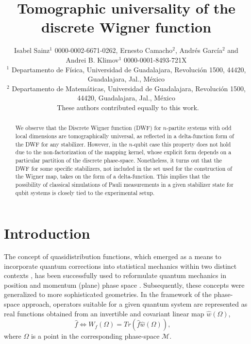 \documentclass{article}
\begin{document}
\title{Tomographic universality of the discrete Wigner function}

\begin{abstract}
We observe that the Discrete Wigner function (DWF) for $n$-partite systems with
odd local dimensions are tomographically universal, as reflected in a
delta-function form of the DWF for any stabilizer. However, in the $n$-qubit
case this property does not hold due to the non-factorization of the mapping
kernel, whose explicit form depends on a particular partition of the discrete
phase-space. Nonetheless, it turns out that the DWF for some specific
stabilizers, not included in the set used for the construction of the Wigner
map, takes on the form of a delta-function. This implies that the possibility of
classical simulations of Pauli measurements in a given stabilizer state for
qubit systems is closely tied to the experimental setup.
\end{abstract}

\author{
  Isabel Sainz$^{1}$ 0000-0002-6671-0262,
  Ernesto Camacho$^{2}$,
  Andrés García$^{2}$
  and Andrei B. Klimov$^{1}$ 0000-0001-8493-721X \\
  $^{1}$ \quad Departamento de Física, Universidad de Guadalajara, Revolución
  1500, 44420, Guadalajara, Jal., México\\
  $^{2}$ \quad Departamento de Matemáticas, Universidad de Guadalajara,
  Revolución 1500, 44420, Guadalajara, Jal., México\\
  \ddag\ These authors contributed equally to this work.
}

\maketitle

\section{Introduction}

The concept of quasidistribution functions, which emerged as a means to
incorporate quantum corrections into statistical mechanics within two
distinct contexts \cite{wigner,bloch}, has been successfully used to
reformulate quantum mechanics in position and momentum (plane) phase space 
\cite{groenewold,moyal}. Subsequently, these concepts were generalized to
more sophisticated geometries. In the framework of the phase-space approach,
operators suitable for a given quantum system are represented as real
functions obtained from an invertible and covariant linear map $\hat{w}%
(\Omega )$,%
\begin{equation*}
\hat{f}\Leftrightarrow W_{f}(\Omega )=Tr\left( \hat{f}\hat{w}(\Omega
)\right) ,\quad
\end{equation*}%
where $\Omega $ is a point in the corresponding phase-space $\mathcal{M}$.
\end{document}
